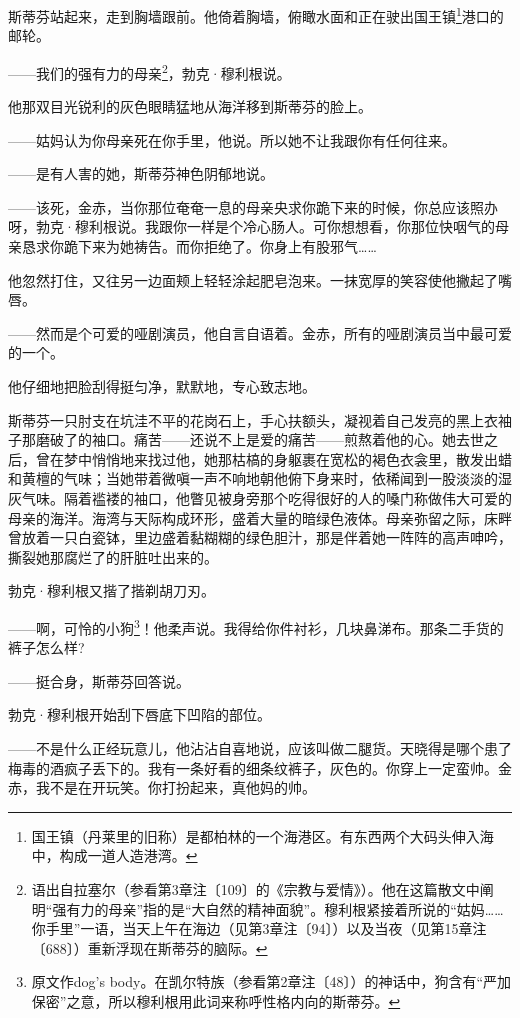 \par 斯蒂芬站起来，走到胸墙跟前。他倚着胸墙，俯瞰水面和正在驶出国王镇\footnote{国王镇（丹莱里的旧称）是都柏林的一个海港区。有东西两个大码头伸入海中，构成一道人造港湾。}港口的邮轮。
\par ——我们的强有力的母亲\footnote{语出自拉塞尔（参看第3章注〔109〕的《宗教与爱情》）。他在这篇散文中阐明“强有力的母亲”指的是“大自然的精神面貌”。穆利根紧接着所说的“姑妈……你手里”一语，当天上午在海边（见第3章注〔94〕）以及当夜（见第15章注〔688〕）重新浮现在斯蒂芬的脑际。}，勃克·穆利根说。
\par 他那双目光锐利的灰色眼睛猛地从海洋移到斯蒂芬的脸上。
\par ——姑妈认为你母亲死在你手里，他说。所以她不让我跟你有任何往来。
\par ——是有人害的她，斯蒂芬神色阴郁地说。
\par ——该死，金赤，当你那位奄奄一息的母亲央求你跪下来的时候，你总应该照办呀，勃克·穆利根说。我跟你一样是个冷心肠人。可你想想看，你那位快咽气的母亲恳求你跪下来为她祷告。而你拒绝了。你身上有股邪气……
\par 他忽然打住，又往另一边面颊上轻轻涂起肥皂泡来。一抹宽厚的笑容使他撇起了嘴唇。
\par ——然而是个可爱的哑剧演员，他自言自语着。金赤，所有的哑剧演员当中最可爱的一个。
\par 他仔细地把脸刮得挺匀净，默默地，专心致志地。
\par 斯蒂芬一只肘支在坑洼不平的花岗石上，手心扶额头，凝视着自己发亮的黑上衣袖子那磨破了的袖口。痛苦——还说不上是爱的痛苦——煎熬着他的心。她去世之后，曾在梦中悄悄地来找过他，她那枯槁的身躯裹在宽松的褐色衣衾里，散发出蜡和黄檀的气味；当她带着微嗔一声不响地朝他俯下身来时，依稀闻到一股淡淡的湿灰气味。隔着褴褛的袖口，他瞥见被身旁那个吃得很好的人的嗓门称做伟大可爱的母亲的海洋。海湾与天际构成环形，盛着大量的暗绿色液体。母亲弥留之际，床畔曾放着一只白瓷钵，里边盛着黏糊糊的绿色胆汁，那是伴着她一阵阵的高声呻吟，撕裂她那腐烂了的肝脏吐出来的。
\par 勃克·穆利根又揩了揩剃胡刀刃。
\par ——啊，可怜的小狗\footnote{原文作dog’s body。在凯尔特族（参看第2章注〔48〕）的神话中，狗含有“严加保密”之意，所以穆利根用此词来称呼性格内向的斯蒂芬。}！他柔声说。我得给你件衬衫，几块鼻涕布。那条二手货的裤子怎么样?
\par ——挺合身，斯蒂芬回答说。
\par 勃克·穆利根开始刮下唇底下凹陷的部位。
\par ——不是什么正经玩意儿，他沾沾自喜地说，应该叫做二腿货。天晓得是哪个患了梅毒的酒疯子丢下的。我有一条好看的细条纹裤子，灰色的。你穿上一定蛮帅。金赤，我不是在开玩笑。你打扮起来，真他妈的帅。
